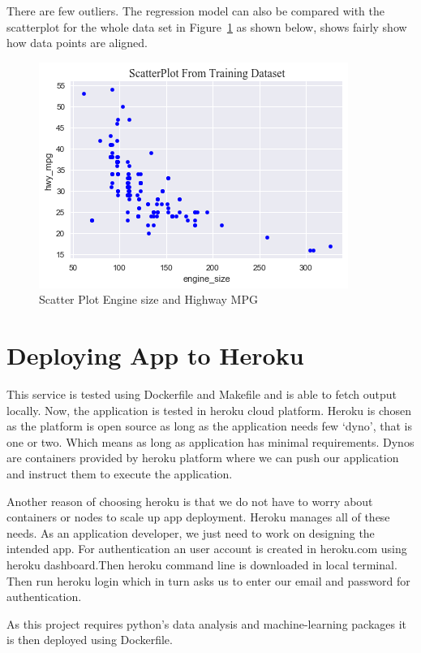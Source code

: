  
 There are few outliers. The regression model can also be compared with 
 the scatterplot for the whole data set
 in Figure~\ref{fig:scatterplt} as shown below, shows fairly show how data 
 points are aligned.
 
  \begin{figure}[h!]
  \includegraphics[scale=1.0]{images/scatterplot.png}
  \caption{Scatter Plot Engine size and Highway MPG}
\label{fig:scatterplt}
\end{figure} 
 
\section{Deploying App to Heroku} 

This service is tested using Dockerfile and Makefile and is able to fetch
output locally. Now, the application is tested in heroku cloud platform. Heroku
is chosen as the platform is open source as long as the application needs few 
`dyno', that is one or two. Which means as long as application has minimal
requirements. Dynos are containers provided by heroku platform where we can 
push our application and instruct them to execute the application.

Another reason of choosing heroku is that we do not have to worry about 
containers or nodes to scale up app deployment. Heroku manages all of these
needs. As an application developer, we just need to work on designing the 
intended app. For authentication an user account is created in heroku.com
using heroku dashboard.Then heroku command line is downloaded in local terminal.
Then run heroku login which in turn asks us to enter our email and password
for authentication.

As this project requires python's data analysis and machine-learning packages 
it is then deployed using Dockerfile. 

